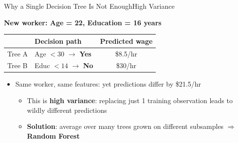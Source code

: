 \documentclass[dvipsnames,hyperref={pdfpagelabels=false}]{beamer}
\begin{document}
\begin{frame}{Why a Single Decision Tree Is Not Enough}{High Variance}

\begin{center}
  \textbf{New worker: Age = 22, Education = 16 years}\\[8pt]
  \small
  \begin{tabular}{@{}llc@{}}
    \toprule
     & Decision path & Predicted wage \\
    \midrule
    Tree A & Age $< 30$ $\to$ \textbf{Yes} & \$8.5/hr \\
    Tree B & Educ $< 14$ $\to$ \textbf{No} & \$30/hr \\
    \bottomrule
  \end{tabular}
\end{center}

\vspace{0.2cm}
\begin{itemize}
  \item Same worker, same features: yet predictions differ by \$21.5/hr
  \begin{itemize}

  \vspace{0.2cm}

  \item This is \textbf{high variance}: replacing just 1 training observation leads to wildly different predictions
  \vspace{0.2cm}

  \item \textbf{Solution}: average over many trees grown on different subsamples $\Rightarrow$ \textbf{Random Forest}
  \end{itemize}

\end{itemize}
\end{frame}
\end{document}
